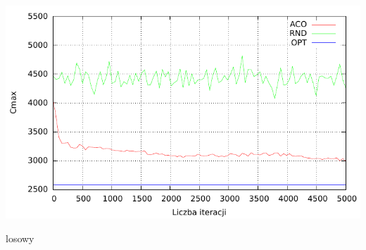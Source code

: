 \documentclass[10pt,a4paper]{article}
\begin{document}
\begin{center}
\\
\includegraphics{./figures/inst01_rnd_smooth.pdf}
\caption{losowy}


\end{center}
\end{document}
